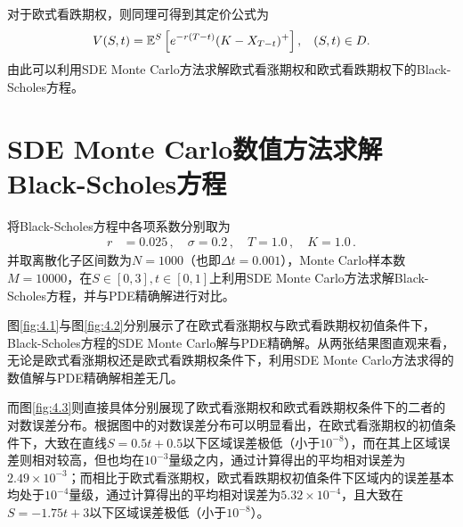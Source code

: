 \documentclass[oneside]{sysuthesis}
\begin{document}
对于欧式看跌期权，则同理可得到其定价公式为
\begin{equation}
	V(S,t)=\mathbb{E}^S\left[e^{-r(T-t)}(K-X_{T-t})^+\right],\hspace{0.3cm}(S,t)\in D.
\end{equation}
由此可以利用SDE Monte Carlo方法求解欧式看涨期权和欧式看跌期权下的Black-Scholes方程。

\section{SDE Monte Carlo数值方法求解Black-Scholes方程}

将Black-Scholes方程中各项系数分别取为
\begin{equation*}
	\begin{split}
		r&=0.025\,, \quad
		\sigma=0.2\,, \quad
		T=1.0\,, \quad
		K=1.0\,.
	\end{split}
\end{equation*}
并取离散化子区间数为$N=1000$（也即$\Delta t=0.001$），Monte Carlo样本数$M=10000$，在$S\in[0,3],t\in[0,1]$上利用SDE Monte Carlo方法求解Black-Scholes方程，并与PDE精确解进行对比。

图\ref{fig:4.1}与图\ref{fig:4.2}分别展示了在欧式看涨期权与欧式看跌期权初值条件下，Black-Scholes方程的SDE Monte Carlo解与PDE精确解。从两张结果图直观来看，无论是欧式看涨期权还是欧式看跌期权条件下，利用SDE Monte Carlo方法求得的数值解与PDE精确解相差无几。


而图\ref{fig:4.3}则直接具体分别展现了欧式看涨期权和欧式看跌期权条件下的二者的对数误差分布。根据图中的对数误差分布可以明显看出，在欧式看涨期权的初值条件下，大致在直线$S=0.5t+0.5$以下区域误差极低（小于$10^{-8}$），而在其上区域误差则相对较高，但也均在$10^{-3}$量级之内，通过计算得出的平均相对误差为$2.49\times 10^{-3}$；而相比于欧式看涨期权，欧式看跌期权初值条件下区域内的误差基本均处于$10^{-4}$量级，通过计算得出的平均相对误差为$5.32\times 10^{-4}$，且大致在$S=-1.75t+3$以下区域误差极低（小于$10^{-8}$）。
\end{document}
